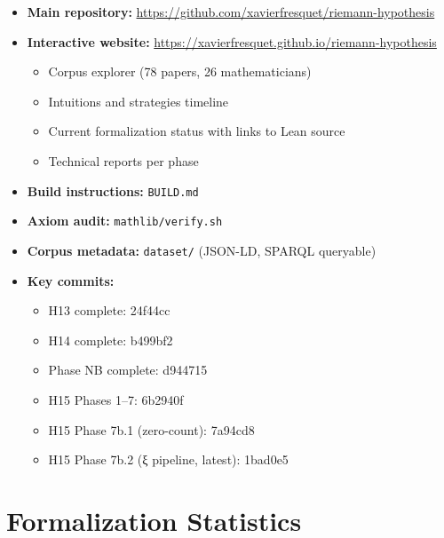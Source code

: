 \documentclass[11pt,a4paper]{article}
\begin{document}
\begin{itemize}
  \item \textbf{Main repository:} \url{https://github.com/xavierfresquet/riemann-hypothesis}

  \item \textbf{Interactive website:} \url{https://xavierfresquet.github.io/riemann-hypothesis}
    \begin{itemize}
      \item Corpus explorer (78 papers, 26 mathematicians)
      \item Intuitions and strategies timeline
      \item Current formalization status with links to Lean source
      \item Technical reports per phase
    \end{itemize}

  \item \textbf{Build instructions:} \texttt{BUILD.md}

  \item \textbf{Axiom audit:} \texttt{mathlib/verify.sh}

  \item \textbf{Corpus metadata:} \texttt{dataset/} (JSON-LD, SPARQL queryable)

  \item \textbf{Key commits:}
    \begin{itemize}
      \item H13 complete: 24f44cc
      \item H14 complete: b499bf2
      \item Phase NB complete: d944715
      \item H15 Phases 1--7: 6b2940f
      \item H15 Phase 7b.1 (zero-count): 7a94cd8
      \item H15 Phase 7b.2 (ξ pipeline, latest): 1bad0e5
    \end{itemize}
\end{itemize}

\section{Formalization Statistics}
\label{app:stats}
\end{document}
